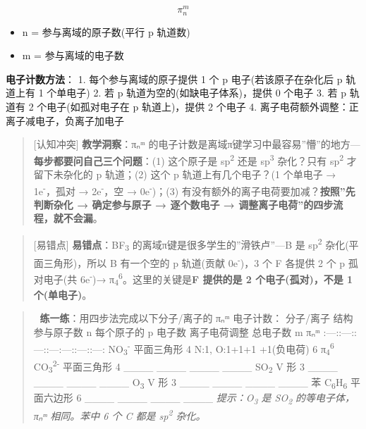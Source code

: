 \[
\pi_n^m
\]

\begin{itemize}
\tightlist
\item
  n = 参与离域的原子数(平行 p 轨道数)
\item
  m = 参与离域的电子数
\end{itemize}

\textbf{电子计数方法}：
1. 每个参与离域的原子提供 1 个 p 电子(若该原子在杂化后 p 轨道上有 1 个单电子)
2. 若 p 轨道为空的(如缺电子体系)，提供 0 个电子
3. 若 p 轨道有 2 个电子(如孤对电子在 p 轨道上)，提供 2 个电子
4. 离子电荷额外调整：正离子减电子，负离子加电子

\begin{quote}
{[}认知冲突{]} \textbf{教学洞察}：πₙᵐ 的电子计数是离域π键学习中最容易''懵''的地方---\textbf{每步都要问自己三个问题}：(1) 这个原子是 sp\textsuperscript{2} 还是 sp\textsuperscript{3} 杂化？只有 sp\textsuperscript{2} 才留下未杂化的 p 轨道；(2) 这个 p 轨道上有几个电子？(1 个单电子 → 1e\textsuperscript{-}，孤对 → 2e\textsuperscript{-}，空 → 0e\textsuperscript{-})；(3) 有没有额外的离子电荷要加减？\textbf{按照''先判断杂化 → 确定参与原子 → 逐个数电子 → 调整离子电荷''的四步流程，就不会漏}。
\end{quote}

\begin{quote}
{[}易错点{]} \textbf{易错点}：BF\textsubscript{3} 的离域π键是很多学生的''滑铁卢''---B 是 sp\textsuperscript{2} 杂化(平面三角形)，所以 B 有一个空的 p 轨道(贡献 0e\textsuperscript{-})，3 个 F 各提供 2 个 p 孤对电子(共 6e\textsuperscript{-})→ π\textsubscript{4}\textsuperscript{6}。这里的关键是\textbf{F 提供的是 2 个电子(孤对)，不是 1 个(单电子)}。
\end{quote}

\begin{quote}
📝 \textbf{练一练}：用四步法完成以下分子/离子的 πₙᵐ 电子计数：
\textbar{} 分子/离子 \textbar{} 结构 \textbar{} 参与原子数 n \textbar{} 每个原子的 p 电子数 \textbar{} 离子电荷调整 \textbar{} 总电子数 m \textbar{} πₙᵐ \textbar{}
\textbar:---:\textbar:---:\textbar:---:\textbar:---\textbar:---:\textbar:---:\textbar:---:\textbar{}
\textbar{} NO\textsubscript{3}\textsuperscript{-} \textbar{} 平面三角形 \textbar{} 4 \textbar{} N:1, O:1+1+1 \textbar{} +1(负电荷) \textbar{} 6 \textbar{} π\textsubscript{4}\textsuperscript{6} \textbar{}
\textbar{} CO\textsubscript{3}\textsuperscript{2-} \textbar{} 平面三角形 \textbar{} 4 \textbar{} \_\_\_\_ \textbar{} \_\_\_\_ \textbar{} \_\_\_\_ \textbar{} \_\_\_\_ \textbar{}
\textbar{} SO\textsubscript{2} \textbar{} V 形 \textbar{} 3 \textbar{} \_\_\_\_ \textbar{} \_\_\_\_ \textbar{} \_\_\_\_ \textbar{} \_\_\_\_ \textbar{}
\textbar{} O\textsubscript{3} \textbar{} V 形 \textbar{} 3 \textbar{} \_\_\_\_ \textbar{} \_\_\_\_ \textbar{} \_\_\_\_ \textbar{} \_\_\_\_ \textbar{}
\textbar{} 苯 C\textsubscript{6}H\textsubscript{6} \textbar{} 平面六边形 \textbar{} 6 \textbar{} \_\_\_\_ \textbar{} \_\_\_\_ \textbar{} \_\_\_\_ \textbar{} \_\_\_\_ \textbar{}
\emph{提示：O\textsubscript{3} 是 SO\textsubscript{2} 的等电子体，πₙᵐ 相同。苯中 6 个 C 都是 sp\textsuperscript{2} 杂化。}
\end{quote}

